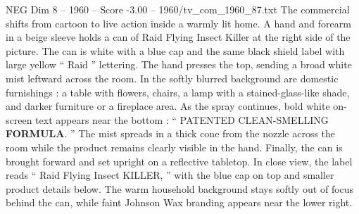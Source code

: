 \begin{textsample}{NEG Dim 8 – 1960 – Score -3.00 – 1960/tv\_com\_1960\_87.txt}
The commercial shifts from cartoon to live action inside a warmly lit home.
A hand and forearm in a beige sleeve holds a can of Raid Flying Insect Killer at the right side of the picture.
The can is white with a blue cap and the same black shield label with large yellow “ Raid ” lettering.
The hand presses the top, sending a broad white mist leftward across the room.
In the softly blurred background are domestic furnishings : a table with flowers, chairs, a lamp with a stained-glass-like shade, and darker furniture or a fireplace area.
As the spray continues, bold white on-screen text appears near the bottom : “ PATENTED CLEAN-SMELLING \textbf{FORMULA}. ” The mist spreads in a thick cone from the nozzle across the room while the product remains clearly visible in the hand.
Finally, the can is brought forward and set upright on a reflective tabletop.
In close view, the label reads “ Raid Flying Insect KILLER, ” with the blue cap on top and smaller product details below.
The warm household background stays softly out of focus behind the can, while faint Johnson Wax branding appears near the lower right.

\end{textsample}
